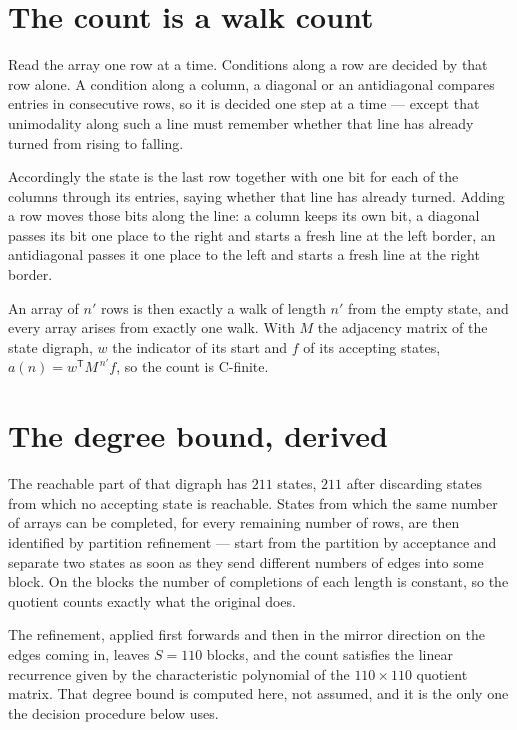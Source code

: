 \documentclass[11pt]{article}
\theoremstyle{definition}
\begin{document}
\section{The count is a walk count}

Read the array one row at a time. Conditions along a row are decided by that row alone. A condition along a column, a diagonal or an antidiagonal compares entries in consecutive rows, so it is decided one step at a time --- except that unimodality along such a line must remember whether that line has already turned from rising to falling.

Accordingly the state is the last row together with one bit for each of the columns through its entries, saying whether that line has already turned. Adding a row moves those bits along the line: a column keeps its own bit, a diagonal passes its bit one place to the right and starts a fresh line at the left border, an antidiagonal passes it one place to the left and starts a fresh line at the right border.

An array of $n'$ rows is then exactly a walk of length $n'$ from the empty state, and every array arises from exactly one walk. With $M$ the adjacency matrix of the state digraph, $w$ the indicator of its start and $f$ of its accepting states, $a(n) = w^{\mathsf T}M^{\,n'}f$, so the count is C-finite.

\section{The degree bound, derived}

The reachable part of that digraph has $211$ states, $211$ after discarding states from which no accepting state is reachable. States from which the same number of arrays can be completed, for every remaining number of rows, are then identified by partition refinement --- start from the partition by acceptance and separate two states as soon as they send different numbers of edges into some block. On the blocks the number of completions of each length is constant, so the quotient counts exactly what the original does.

The refinement, applied first forwards and then in the mirror direction on the edges coming in, leaves $S = 110$ blocks, and the count satisfies the linear recurrence given by the characteristic polynomial of the $110 \times 110$ quotient matrix. That degree bound is computed here, not assumed, and it is the only one the decision procedure below uses.
\end{document}
